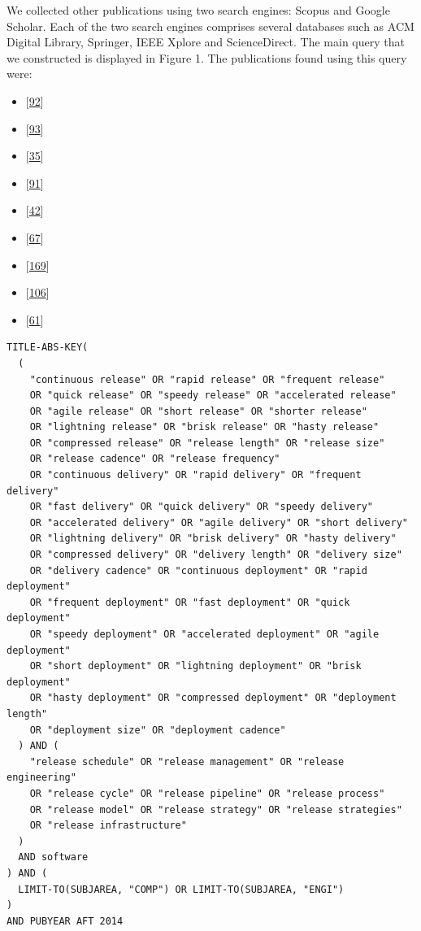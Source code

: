 \documentclass[]{book}
\providecommand{\tightlist}{%
  \setlength{\itemsep}{0pt}\setlength{\parskip}{0pt}}
\begin{document}
We collected other publications using two search engines: Scopus and
Google Scholar. Each of the two search engines comprises several
databases such as ACM Digital Library, Springer, IEEE Xplore and
ScienceDirect. The main query that we constructed is displayed in Figure
1. The publications found using this query were:

\begin{itemize}
\tightlist
\item
  {[}\protect\hyperlink{ref-kaur2019a}{92}{]}
\item
  {[}\protect\hyperlink{ref-kerzazi2013a}{93}{]}
\item
  {[}\protect\hyperlink{ref-castelluccio2017a}{35}{]}
\item
  {[}\protect\hyperlink{ref-karvonen2017a}{91}{]}
\item
  {[}\protect\hyperlink{ref-claes2017a}{42}{]}
\item
  {[}\protect\hyperlink{ref-fujibayashi2017a}{67}{]}
\item
  {[}\protect\hyperlink{ref-souza2015a}{169}{]}
\item
  {[}\protect\hyperlink{ref-laukkanen2018a}{106}{]}
\item
  {[}\protect\hyperlink{ref-dyck2015a}{61}{]}
\end{itemize}

\begin{verbatim}
TITLE-ABS-KEY(
  (
    "continuous release" OR "rapid release" OR "frequent release"
    OR "quick release" OR "speedy release" OR "accelerated release"
    OR "agile release" OR "short release" OR "shorter release"
    OR "lightning release" OR "brisk release" OR "hasty release"
    OR "compressed release" OR "release length" OR "release size"
    OR "release cadence" OR "release frequency"
    OR "continuous delivery" OR "rapid delivery" OR "frequent delivery"
    OR "fast delivery" OR "quick delivery" OR "speedy delivery"
    OR "accelerated delivery" OR "agile delivery" OR "short delivery"
    OR "lightning delivery" OR "brisk delivery" OR "hasty delivery"
    OR "compressed delivery" OR "delivery length" OR "delivery size"
    OR "delivery cadence" OR "continuous deployment" OR "rapid deployment"
    OR "frequent deployment" OR "fast deployment" OR "quick deployment"
    OR "speedy deployment" OR "accelerated deployment" OR "agile deployment"
    OR "short deployment" OR "lightning deployment" OR "brisk deployment"
    OR "hasty deployment" OR "compressed deployment" OR "deployment length"
    OR "deployment size" OR "deployment cadence"
  ) AND (
    "release schedule" OR "release management" OR "release engineering"
    OR "release cycle" OR "release pipeline" OR "release process"
    OR "release model" OR "release strategy" OR "release strategies"
    OR "release infrastructure"
  )
  AND software
) AND (
  LIMIT-TO(SUBJAREA, "COMP") OR LIMIT-TO(SUBJAREA, "ENGI")
)
AND PUBYEAR AFT 2014
\end{verbatim}
\end{document}
